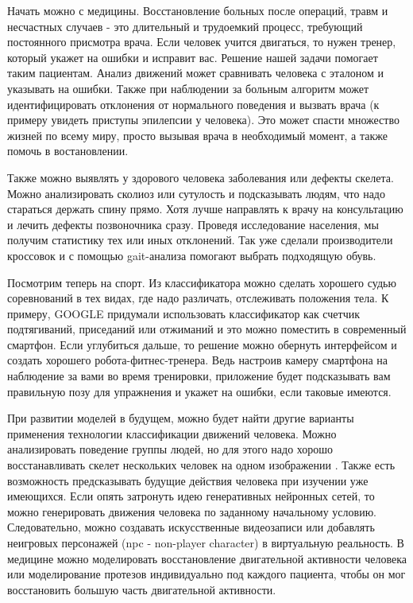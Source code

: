 Начать можно с медицины. Восстановление больных после операций, травм и несчастных случаев - это длительный и трудоемкий процесс, требующий постоянного присмотра врача. Если человек учится двигаться, то нужен тренер, который укажет  на ошибки и исправит вас. Решение нашей задачи помогает таким пациентам. Анализ движений может сравнивать человека с эталоном и указывать на ошибки. Также при наблюдении за больным алгоритм может идентифицировать отклонения от нормального поведения и вызвать врача (к примеру увидеть приступы эпилепсии у человека). Это может спасти множество жизней по всему миру, просто вызывая врача в необходимый момент, а также помочь в востановлении.

Также можно выявлять у здорового человека заболевания или дефекты скелета. Можно анализировать сколиоз или сутулость и подсказывать людям, что надо стараться держать спину прямо. Хотя лучше направлять к врачу на консультацию и лечить дефекты позвоночника сразу. Проведя исследование населения, мы получим статистику тех или иных отклонений. Так уже сделали производители кроссовок и с помощью gait-анализа \cite{WHITTLE1996369} помогают выбрать подходящую обувь.

Посмотрим теперь на спорт. Из классификатора можно сделать хорошего судью соревнований в тех видах, где надо различать, отслеживать положения тела. К примеру, GOOGLE придумали использовать классификатор как счетчик подтягиваний, приседаний или отжиманий \cite{counter} и это можно поместить в современный смартфон. Если углубиться дальше, то решение можно обернуть интерфейсом и создать хорошего робота-фитнес-тренера. Ведь настроив камеру смартфона на наблюдение за вами во время тренировки, приложение будет подсказывать вам правильную позу для упражнения и укажет на ошибки, если таковые имеются.

\hfill \break
При развитии моделей в будущем, можно будет найти другие варианты применения технологии классификации движений человека. Можно анализировать поведение группы людей, но для этого надо хорошо восстанавливать скелет нескольких человек на одном изображении \cite{8765346} \cite{https://doi.org/10.48550/arxiv.1807.04067} \cite{fang2017rmpe}. Также есть возможность предсказывать будущие действия человека при изучении уже имеющихся. Если опять затронуть идею генеративных нейронных сетей, то можно генерировать движения человека по заданному начальному условию. Следовательно, можно создавать искусственные видеозаписи или добавлять неигровых персонажей (npc - non-player character) в виртуальную реальность. В медицине можно моделировать восстановление двигательной активности человека или моделирование протезов индивидуально под каждого пациента, чтобы он мог восстановить большую часть двигательной активности.

